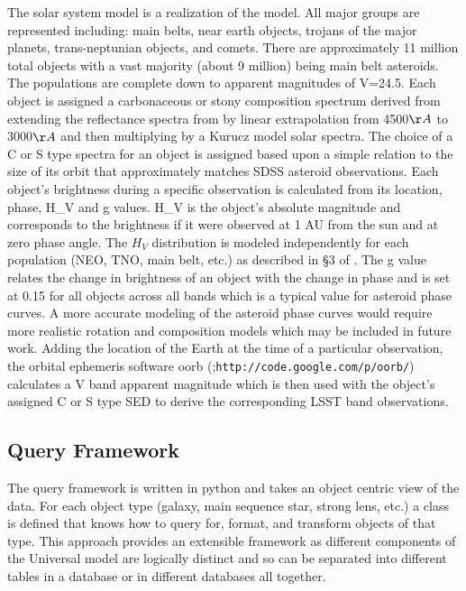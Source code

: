 \documentclass[]{article}
\begin{document}
{The solar system model is a realization of the \citet{grav11} model.  All
major groups are represented including: main belts, near earth
objects, trojans of the major planets, trans-neptunian objects, and
comets. There are approximately 11 million total objects with a vast
majority (about 9 million) being main belt asteroids. The populations
are complete down to apparent magnitudes of V=24.5.  Each object is
assigned a carbonaceous or stony composition spectrum derived from
extending the reflectance spectra from \citet{demeo} by linear
extrapolation from 4500$\AA$ to 3000$\AA$ and then multiplying by a
Kurucz model solar spectra. The choice of a C or S type spectra for an
object is assigned based upon a simple relation to the size of its
orbit that approximately matches SDSS asteroid observations. Each
object's brightness during a specific observation is calculated from
its location, phase, H\_V and g values. H\_V is the object's absolute
magnitude and corresponds to the brightness if it were observed at 1
AU from the sun and at zero phase angle. 
The $H_V$ distribution is modeled independently for each population (NEO,
TNO, main belt, etc.) as described in \S 3 of \citet{grav11}.
The g value
relates the change in brightness of an object with the change in phase
and is set at 0.15 for all objects across all bands which is a typical
value for asteroid phase curves.  A more accurate modeling of the asteroid
phase curves would require more realistic rotation and composition models which 
may be included in future work.
Adding the location of the Earth at the time of a particular observation, the
orbital ephemeris software oorb (\citet{granvik};{\tt http://code.google.com/p/oorb/}) calculates a V band apparent magnitude
which is then used with the object's assigned C or S type SED to
derive the corresponding LSST band observations.

\subsection{Query Framework}
The query framework is written in python and takes an object centric view of the 
data.  For each object type (galaxy, main sequence star, strong lens, etc.) a class
is defined that knows how to query for, format, and transform objects of that type.  
This approach provides an extensible framework as different components of the Universal model
are logically distinct and so can be separated into different tables in a database
or in different databases all together.

}
\end{document}
